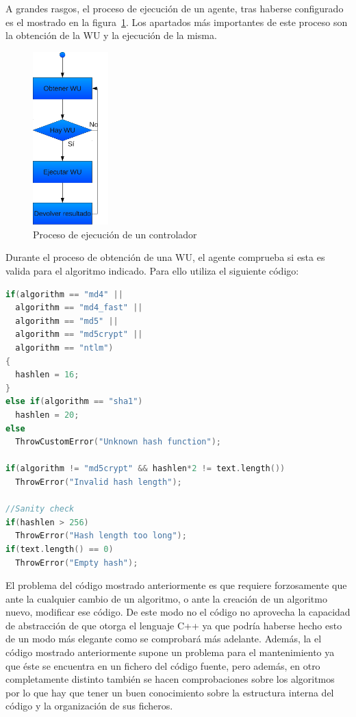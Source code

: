 A grandes rasgos, el proceso de ejecución de un agente, tras haberse configurado es el mostrado en la figura~\ref{fig:cont_proc_ejec}. Los apartados más importantes de este proceso son la obtención de la WU y la ejecución de la misma.

\begin{figure}
	\centering
	\includegraphics[width=0.26\textwidth]{images/proc_cont.pdf}
	\caption{Proceso de ejecución de un controlador}\label{fig:cont_proc_ejec}
\end{figure}

Durante el proceso de obtención de una WU, el agente comprueba si esta es valida para el algoritmo indicado. Para ello utiliza el siguiente código:

\begin{lstlisting}[language=c]
if(algorithm == "md4" || 
  algorithm == "md4_fast" || 
  algorithm == "md5" ||
  algorithm == "md5crypt" ||
  algorithm == "ntlm")
{
  hashlen = 16;
}
else if(algorithm == "sha1")
  hashlen = 20;
else        
  ThrowCustomError("Unknown hash function");
                
if(algorithm != "md5crypt" && hashlen*2 != text.length())
  ThrowError("Invalid hash length");

//Sanity check
if(hashlen > 256)
  ThrowError("Hash length too long");
if(text.length() == 0)
  ThrowError("Empty hash");
\end{lstlisting}

El problema del código mostrado anteriormente es que requiere forzosamente que ante la cualquier cambio de un algoritmo, o ante la creación de un algoritmo nuevo, modificar ese código. De este modo no el código no aprovecha la capacidad de abstracción de que otorga el lenguaje C++ ya que podría haberse hecho esto de un modo más elegante como se comprobará más adelante. Además, la el código mostrado anteriormente supone un problema para el mantenimiento ya que éste se encuentra en un fichero del código fuente, pero además, en otro completamente distinto también se hacen comprobaciones sobre los algoritmos por lo que hay que tener un buen conocimiento sobre la estructura interna del código y la organización de sus ficheros.

